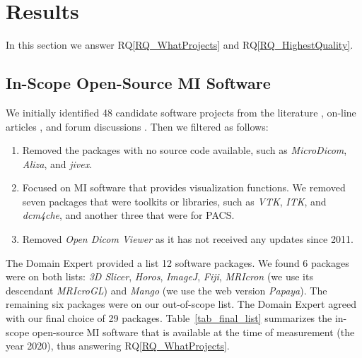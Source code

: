\documentclass[final, 12pt, 3p, times]{elsarticle}
\newcommand{\rqref}[1]{RQ\ref{#1}}
\begin{document}
\section{Results} \label{ch_results}

In this section we answer \rqref{RQ_WhatProjects} and \rqref{RQ_HighestQuality}.

\subsection{In-Scope Open-Source MI Software} \label{SecWhatProjects}

We initially identified 48 candidate software projects from the literature
\cite{Bjorn2017, Bruhschwein2019, Haak2015}, on-line articles \cite{Emms2019,
Hasan2020, Mu2019}, and forum discussions \cite{Samala2014}.  Then we filtered
as follows:

\begin{enumerate}

\item Removed the packages with no source code available, such as
\textit{MicroDicom}, \textit{Aliza}, and \textit{jivex}.

\item Focused on MI software that provides visualization functions.  We removed
seven packages that were toolkits or libraries, such as \textit{VTK},
\textit{ITK}, and \textit{dcm4che}, and another three that were for PACS.

\item Removed \textit{Open Dicom Viewer} as it has not received any
updates since 2011.

\end{enumerate}

The Domain Expert provided a list 12 software packages.  We found 6 packages
were on both lists: \textit{3D Slicer}, \textit{Horos}, \textit{ImageJ},
\textit{Fiji}, \textit{MRIcron} (we use its descendant \textit{MRIcroGL}) and
\textit{Mango} (we use the web version \textit{Papaya}).  The remaining six
packages were on our out-of-scope list. The Domain Expert agreed with our final
choice of 29 packages.  Table~\ref{tab_final_list} summarizes the in-scope
open-source MI software that is available at the time of measurement (the year
2020), thus answering \rqref{RQ_WhatProjects}.
\end{document}

